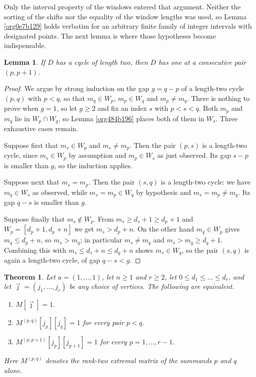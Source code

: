 \documentclass[11pt, a4paper, abstract=yes]{scrartcl}
\theoremstyle{definition}
\theoremstyle{remark}
\theoremstyle{plain}
\newtheorem{lemma}[definition]{Lemma}
\newtheorem{theorem}[definition]{Theorem}
\begin{document}
Only the interval property of the windows entered that argument. Neither the sorting of the shifts
nor the equality of the window lengths was used, so Lemma \ref{org0e7b129} holds verbatim for an
arbitrary finite family of integer intervals with designated points. The next lemma is where those
hypotheses become indispensable.

\begin{lemma}
If \(D\) has a cycle of length two, then \(D\) has one at a consecutive pair \((p,p+1)\).
\label{orgc85a815}
\end{lemma}

\begin{proof}
We argue by strong induction on the gap \(g=q-p\) of a length-two cycle \((p,q)\) with \(p<q\), so
that \(m_q\in W_p\), \(m_p\in W_q\) and \(m_p\ne m_q\). There is nothing to prove when \(g=1\), so
let \(g\ge2\) and fix an index \(s\) with \(p<s<q\). Both \(m_p\) and \(m_q\) lie in
\(W_p\cap W_q\), so Lemma \ref{org484b196} places both of them in \(W_s\). Three exhaustive cases remain.

Suppose first that \(m_s\in W_p\) and \(m_s\ne m_p\). Then the pair \((p,s)\) is a length-two cycle,
since \(m_s\in W_p\) by assumption and \(m_p\in W_s\) as just observed. Its gap \(s-p\) is smaller
than \(g\), so the induction applies.

Suppose next that \(m_s=m_p\). Then the pair \((s,q)\) is a length-two cycle: we have \(m_q\in W_s\)
as observed, while \(m_s=m_p\in W_q\) by hypothesis and \(m_s=m_p\ne m_q\). Its gap \(q-s\) is
smaller than \(g\).

Suppose finally that \(m_s\notin W_p\). From \(m_s\ge d_s+1\ge d_p+1\) and
\(W_p=[d_p+1,d_p+n]\) we get \(m_s>d_p+n\). On the other hand \(m_q\in W_p\) gives
\(m_q\le d_p+n\), so \(m_s>m_q\); in particular \(m_s\ne m_q\) and \(m_s>m_q\ge d_q+1\). Combining
this with \(m_s\le d_s+n\le d_q+n\) shows \(m_s\in W_q\), so the pair \((s,q)\) is again a
length-two cycle, of gap \(q-s<g\).
\end{proof}

\begin{theorem}
Let \(a=(1,\dots,1)\), let \(n\ge1\) and \(r\ge2\), let \(0\le d_1\le\dots\le d_r\), and let
\(\vec\jmath=(j_1,\dots,j_r)\) be any choice of vertices. The following are equivalent.
\begin{enumerate}
\item \(M[\vec\jmath]=1\).
\item \(M^{(p,q)}[j_p][j_q]=1\) for every pair \(p<q\).
\item \(M^{(p,p+1)}[j_p][j_{p+1}]=1\) for every \(p=1,\dots,r-1\).
\end{enumerate}

Here \(M^{(p,q)}\) denotes the rank-two extremal matrix of the summands \(p\) and \(q\) alone.
\label{org12ecee7}
\end{theorem}
\end{document}

